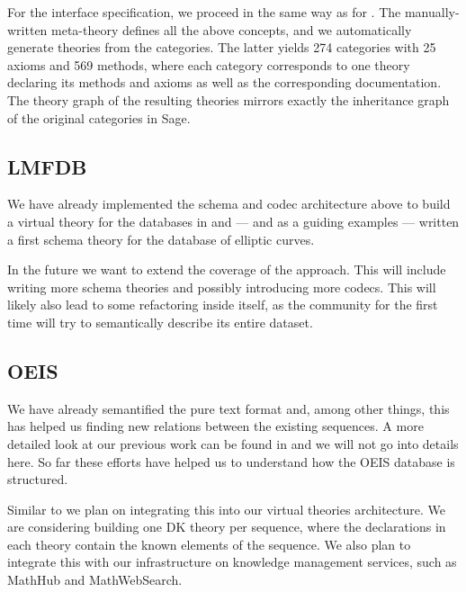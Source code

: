 For the interface specification, we proceed in the same way as for \GAP.
The manually-written meta-theory defines all the above concepts, and we automatically generate theories from the \SageMath categories.
The latter yields 274 categories with 25 axioms and 569 methods, where each category corresponds to one \MMT theory declaring its methods and axioms as well as the corresponding documentation.
The theory graph of the resulting theories mirrors exactly the inheritance graph of the original categories in Sage.

\subsection{LMFDB}\label{sec:lmfdb}
We have already implemented the schema and codec architecture above to build a virtual
theory for the databases in \LMFDB and --- and as a guiding examples --- written a first schema theory for the database of elliptic curves.

In the future we want to extend the coverage of the approach. This will
include writing more schema theories and possibly introducing more codecs. This will
likely also lead to some refactoring inside \LMFDB itself, as the community for the first
time will try to semantically describe its entire dataset.

\subsection{OEIS}
We have already semantified the pure text format and, among other things, this has helped
us finding new relations between the existing sequences. A more detailed look at our
previous work can be found in \cite{LuzKoh:fsarfo16} and we will not go into details
here. So far these efforts have helped us to understand how the OEIS database is
structured.

Similar to \LMFDB we plan on integrating this into our virtual theories architecture. We
are considering building one DK theory per sequence, where the declarations in each theory
contain the known elements of the sequence. We also plan to integrate this with our
infrastructure on knowledge management services, such as MathHub and MathWebSearch.



